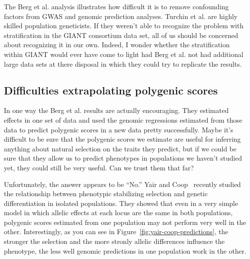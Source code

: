 \documentclass[12pt]{article}
\begin{document}
The Berg et al. analysis illustrates how difficult it is to remove
confounding factors from GWAS and genomic prediction
analyses. Turchin et al. are highly skilled population geneticists. If
they weren't able to recognize the problem with stratification in the
GIANT consortium data set, all of us should be concerned about
recognizing it in our own. Indeed, I wonder whether the stratification
within GIANT would ever have come to light had Berg et al. not had
additional large data sets at there disposal in which they could try
to replicate the results.

\subsection*{Difficulties extrapolating polygenic scores}

In one way the Berg et al. results are actually encouraging. They
estimated effects in one set of data and used the genomic regressions
estimated from those data to predict polygenic scores in a new data
pretty successfully. Maybe it's difficult to be sure that the
polygenic scores we estimate are useful for inferring anything about
natural selection on the traits they predict, but if we could be sure
that they allow us to predict phenotypes in populations we haven't
studied yet, they could still be very useful. Can we trust them that
far?

Unfortunately, the answer appears to be ``No.'' Yair and
Coop~\cite{Yair-Coop-2021} recently studied the relationship between
phenotypic stabilizing selection and genetic differentiation in
isolated populations. They showed that even in a very simple model in
which allelic effects at each locus are the same in both populations,
polygenic scores estimated from one population may not perform very
well in the other. Interestingly, as you can see in
Figure~\ref{fig:yair-coop-predictions}, the stronger the selection and
the more stronly allelic differences influence the phenotype, the less
well genomic predictions in one population work in the other.
\end{document}
